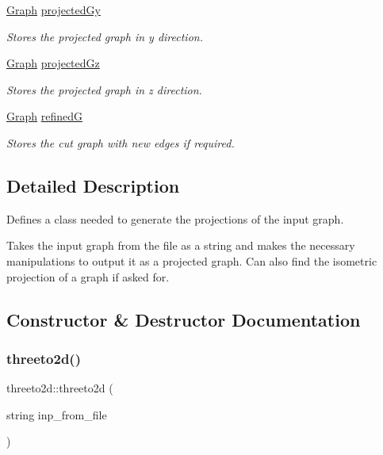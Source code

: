 \begin{DoxyCompactItemize}
\mbox{\label{classthreeto2d_a7656319636748783eebc0c76764a43a8}} 
\mbox{\hyperlink{class_graph}{Graph}} \mbox{\hyperlink{classthreeto2d_a7656319636748783eebc0c76764a43a8}{projected\+Gy}}
\begin{DoxyCompactList}\small\item\em Stores the projected graph in y direction. \end{DoxyCompactList}\item 
\mbox{\label{classthreeto2d_a98d91701269b4a3204a197fd7ef32245}} 
\mbox{\hyperlink{class_graph}{Graph}} \mbox{\hyperlink{classthreeto2d_a98d91701269b4a3204a197fd7ef32245}{projected\+Gz}}
\begin{DoxyCompactList}\small\item\em Stores the projected graph in z direction. \end{DoxyCompactList}\item 
\mbox{\label{classthreeto2d_a7f864779f019cbc5fdb4f6e2f65ea453}} 
\mbox{\hyperlink{class_graph}{Graph}} \mbox{\hyperlink{classthreeto2d_a7f864779f019cbc5fdb4f6e2f65ea453}{refinedG}}
\begin{DoxyCompactList}\small\item\em Stores the cut graph with new edges if required. \end{DoxyCompactList}\end{DoxyCompactItemize}


\subsection{Detailed Description}
Defines a class needed to generate the projections of the input graph. 

Takes the input graph from the file as a string and makes the necessary manipulations to output it as a projected graph. Can also find the isometric projection of a graph if asked for. 

\subsection{Constructor \& Destructor Documentation}
\mbox{\label{classthreeto2d_a12ef3feb5556b9bf3bb6387e093acfcf}} 
\subsubsection{\texorpdfstring{threeto2d()}{threeto2d()}}
{\footnotesize\ttfamily threeto2d\+::threeto2d (\begin{DoxyParamCaption}\item[{string}]{inp\+\_\+from\+\_\+file }\end{DoxyParamCaption})}




